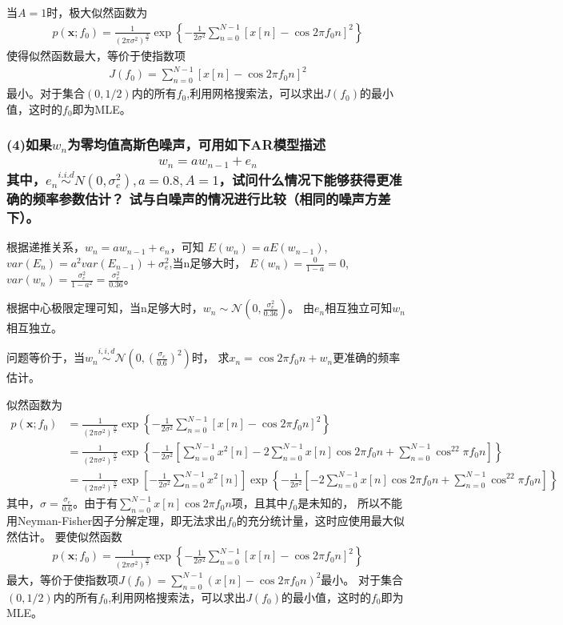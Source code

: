\documentclass[fontset=windows]{article}
\numberwithin{figure}{section}
\begin{document}
当\(A=1\)时，极大似然函数为
\begin{align*}
	p(\mathbf{x};f_0)=\frac{1}{(2\pi \sigma^2)^{\frac{N}{2}}}
	\exp\left\{-\frac{1}{2\sigma^2}\sum_{n=0}^{N-1}\left[x[n]-\cos2\pi f_0n\right]^2\right\}
\end{align*}
使得似然函数最大，等价于使指数项
\begin{align*}
	J(f_0)=\sum_{n=0}^{N-1}\left[x[n]-\cos2\pi f_0n\right]^2
\end{align*}
最小。对于集合\((0,1/2)\)内的所有\(f_0\),利用网格搜索法，可以求出\(J(f_0)\)的最小值，这时的\(f_0\)即为MLE。

\subsubsection*{(4)如果\(w_n\)为零均值高斯色噪声，可用如下AR模型描述
	\begin{align*}
		w_n=aw_{n-1}+e_n
	\end{align*}
	其中，\(e_n\overset{i.i.d}{\sim}N(0,\sigma_e^2),a=0.8,A=1\)，试问什么情况下能够获得更准确的频率参数估计？
	试与白噪声的情况进行比较（相同的噪声方差下）。}

根据递推关系，\(w_n=aw_{n-1}+e_n\)，可知
\(E(w_n)=aE(w_{n-1})\),\(var(E_n)=a^2var(E_{n-1})+\sigma_e^2\),当n足够大时，
\(E(w_n)=\frac{0}{1-a}=0\),\(var(w_n)=\frac{\sigma_e^2}{1-a^2}=\frac{\sigma_e^2}{0.36}\)。

根据中心极限定理可知，当n足够大时，\(w_n\sim\mathcal{N}(0,\frac{\sigma_e^2}{0.36})\)。
由\(e_n\)相互独立可知\(w_n\)相互独立。

问题等价于，当\(w_n\overset{i,i,d}{\sim}\mathcal{N}\left(0,\left( \frac{\sigma_e}{0.6}\right)^2\right)\)时，
求\(x_n=\cos2\pi f_0 n +w_n\)更准确的频率估计。

似然函数为
\begin{align*}
	p(\mathbf{x};f_0) & =\frac{1}{(2\pi \sigma^2)^{\frac{N}{2}}}
	\exp\left\{-\frac{1}{2\sigma^2}\sum_{n=0}^{N-1}\left[x[n]-\cos2\pi f_0n\right]^2\right\} \\
	                  & =\frac{1}{(2\pi \sigma^2)^{\frac{N}{2}}}
	\exp\left\{-\frac{1}{2\sigma^2}\left[\sum_{n=0}^{N-1}x^2[n]-
	2\sum_{n=0}^{N-1}x[n]\cos2\pi f_0 n+\sum_{n=0}^{N-1}\cos^22\pi f_0 n
	\right]\right\}                                                                          \\
	                  & =\frac{1}{(2\pi \sigma^2)^{\frac{N}{2}}}
	\exp\left[-\frac{1}{2\sigma^2}\sum_{n=0}^{N-1}x^2[n]\right]
	\exp\left\{-\frac{1}{2\sigma^2}\left[-
	2\sum_{n=0}^{N-1}x[n]\cos2\pi f_0 n+\sum_{n=0}^{N-1}\cos^22\pi f_0 n
	\right]\right\}
\end{align*}
其中，\(\sigma=\frac{\sigma_e}{0.6}\)。由于有\(\sum_{n=0}^{N-1}x[n]\cos2\pi f_0 n\)项，且其中\(f_0\)是未知的，
所以不能用Neyman-Fisher因子分解定理，即无法求出\(f_0\)的充分统计量，这时应使用最大似然估计。
要使似然函数
\begin{align*}
	p(\mathbf{x};f_0)=\frac{1}{(2\pi \sigma^2)^{\frac{N}{2}}}
	\exp\left\{-\frac{1}{2\sigma^2}\sum_{n=0}^{N-1}\left[x[n]-\cos2\pi f_0n\right]^2\right\}
\end{align*}
最大，等价于使指数项\(J(f_0)=\sum_{n=0}^{N-1}\left(x[n]-\cos2\pi f_0 n\right)^2\)最小。
对于集合\((0,1/2)\)内的所有\(f_0\),利用网格搜索法，可以求出\(J(f_0)\)的最小值，这时的\(f_0\)即为MLE。
\end{document}
